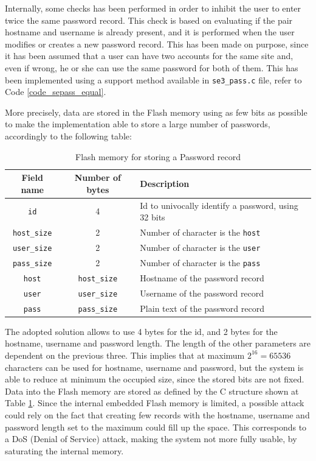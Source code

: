 Internally, some checks has been performed in order to inhibit the user to enter twice the same password record. This check is based on evaluating if the pair hostname and username is already present, and it is performed when the user modifies or creates a new password record. This has been made on purpose, since it has been assumed that a user can have two accounts for the same site and, even if wrong, he or she can use the same password for both of them. This has been implemented using a support method available in \texttt{se3\_pass.c} file, refer to Code \ref{code_sepass_equal}.

More precisely, data are stored in the Flash memory using as few bits as possible to make the implementation able to store a large number of passwords, accordingly to the following table:
\begin{table}[H]
	\begin{tabular}{ |c c l| }
		\hline
		\textbf{Field name} & \textbf{Number of bytes} & \textbf{Description}\\ 
		\hline
		\texttt{id} & 4 & Id to univocally identify a password, using 32 bits\\ 
		\hline
		\texttt{host\_size} & 2 & Number of character is the \texttt{host} \\  
		\hline
		\texttt{user\_size} & 2 &  Number of character is the \texttt{user} \\  
		\hline
		\texttt{pass\_size} & 2 &  Number of character is the \texttt{pass} \\  
		\hline
		\texttt{host} & \texttt{host\_size} & Hostname of the password record \\  
		\hline
		\texttt{user} & \texttt{user\_size} & Username of the password record\\  
		\hline
		\texttt{pass} & \texttt{pass\_size} & Plain text of the password record\\  
		\hline
	\end{tabular}
	\caption{Flash memory for storing a Password record}
	\label{tab:flashmem_pass}
\end{table}

The adopted solution allows to use 4 bytes for the id, and 2 bytes for the hostname, username and password length. The length of the other parameters are dependent on the previous three. This implies that at maximum $2^{16} = 65536$ characters can be used for hostname, username and password, but the system is able to reduce at minimum the occupied size, since the stored bits are not fixed.\newline\newline
Data into the Flash memory are stored as defined by the C structure shown at Table \ref{tab:flashmem_pass}. Since the internal embedded Flash memory is limited, a possible attack could rely on the fact that creating few records with the hostname, username and password length set to the maximum could fill up the space. This corresponds to a DoS (Denial of Service) attack, making the system not more fully usable, by saturating the internal memory.

